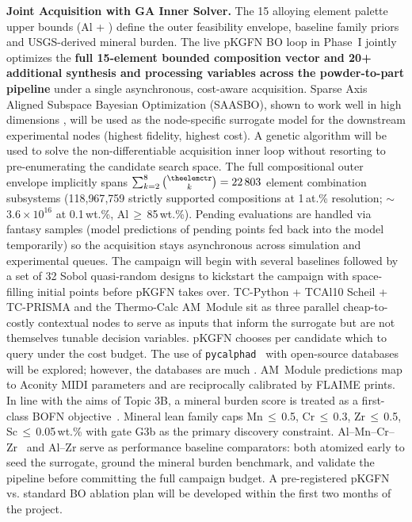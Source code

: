 \documentclass[11pt,letterpaper]{article}
\newcommand{\kmin}{2}                    %
\newcommand{\kmax}{8}                    %
\newcounter{elemctr}
\newcommand{\elementcount}{\theelemctr}  %
\def\elementlisttex{}
\newcommand{\subsystemcount}{22\,803}    %
\newcommand{\feasiblepairsOneAt}{118{,}967{,}759}
\newcommand{\feasiblepairsTenthWt}{$\sim$$3.6\times10^{16}$}
\begin{document}
\textbf{Joint Acquisition with GA Inner Solver.}
The 15 alloying element palette upper bounds (Al + \elementlisttex{})
define the outer feasibility envelope, baseline family priors and USGS-derived mineral burden. The live pKGFN BO loop in
Phase~I jointly optimizes the \textbf{full 15-element bounded composition
vector and 20+ additional synthesis and processing variables across the powder-to-part pipeline} under a single asynchronous, cost-aware acquisition. Sparse Axis Aligned Subspace Bayesian Optimization (SAASBO), shown to work well in high dimensions \cite{eriksson_2021_21030034,baird_2022_commatsci}, will be used as the node-specific surrogate model for the downstream experimental nodes (highest fidelity, highest cost). A genetic algorithm will be used to solve the non-differentiable acquisition inner loop without resorting to pre-enumerating the candidate search space.
The full compositional outer envelope implicitly spans
$\sum_{k=2}^{8}\binom{\elementcount}{k}=\subsystemcount{}$
element combination subsystems (\feasiblepairsOneAt{} strictly
supported compositions at 1\,at.\% resolution; \feasiblepairsTenthWt{}
at 0.1\,wt.\%, Al\,$\geq$\,85\,wt.\%).
Pending evaluations are handled via fantasy samples (model predictions of pending points fed back into the model temporarily) so the acquisition
stays asynchronous across simulation and experimental queues. The campaign will begin with several baselines followed by a set of 32 Sobol quasi-random designs to kickstart the campaign with space-filling
initial points before pKGFN takes over. 
TC-Python + TCAl10 Scheil + TC-PRISMA %
and the Thermo-Calc AM~Module %
sit as three parallel cheap-to-costly contextual nodes to serve as inputs
that inform the surrogate but are not themselves tunable decision
variables. pKGFN chooses per candidate which to query under the cost
budget. The use of \texttt{pycalphad}~\cite{otis_2024_97810035} with open-source databases will be explored; however, the databases are much . AM~Module predictions map to Aconity MIDI parameters and are
reciprocally calibrated by FLAIME prints. In line with the aims of Topic 3B, a mineral burden score is treated as a
first-class BOFN objective~\cite{bocklund_2020_20011161,eriksson_2021_21030034,sabanzagil_2025_s4358802}.
Mineral lean family caps Mn\,$\leq$\,0.5, Cr\,$\leq$\,0.3,
Zr\,$\leq$\,0.5, Sc\,$\leq$\,0.05\,wt.\% with gate G3b as the primary
discovery constraint. Al--Mn--Cr--Zr~\cite{thapliyal_2020_jmtla201} %
and Al--Zr %
serve as performance baseline comparators: both atomized early to seed the surrogate, ground the
mineral burden benchmark, and validate the pipeline before committing
the full campaign budget. A pre-registered pKGFN vs. standard BO
ablation plan will be developed within the first two months of the project.
\end{document}
